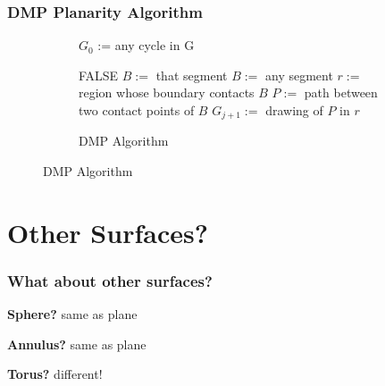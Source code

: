 \documentclass{beamer}
\begin{document}
    \frame
    {
        \frametitle{DMP Planarity Algorithm}
        \begin{figure}
            \centering
            \SetCustomAlgoRuledWidth{5.5cm}
            \tiny
            \begin{subfigure}[h]{5.5cm} 
                \begin{algorithm}[H]
                    \NoCaptionOfAlgo
                    \DontPrintSemicolon
                        $G_0$ := any cycle in G \;
                        
                        {
                            {
                                \Return FALSE \;
                            }
                            {
                                $B :=$ that segment \;
                            }
                            \Else
                            {
                                $B :=$ any segment \;
                            }
                            $r :=$ region whose boundary contacts $B$ \;
                            $P :=$ path between two contact points of $B$ \;
                            $G_{j+1} :=$ drawing of $P$ in $r$ \;
                        }
                    \caption{\tiny DMP Algorithm}
                \end{algorithm}
            \end{subfigure}
        \end{figure}
        \vfill
    }
    
    \section{Other Surfaces?}

    \frame
    {
    \frametitle{What about other surfaces?}
        \textbf{Sphere?} \pause same as plane

        \medskip
        \textbf{Annulus?} \pause same as plane
        
        \medskip
        \textbf{Torus?} \pause different!

        \bigskip
        
    }
\end{document}
